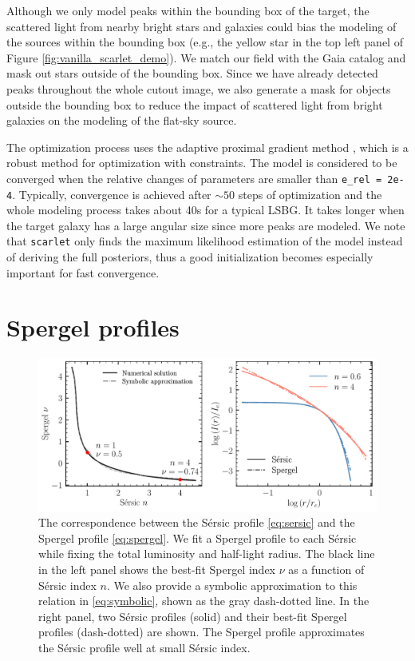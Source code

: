 \documentclass[twocolumn,astrosymb,twocolappendix,linenumbers]{aastex631}
\newcommand{\code}[1]{\texttt{#1}}
\newcommand{\sersic}{S\'ersic}
\begin{document}
\begin{CJK*}{UTF8}{gbsn}
Although we only model peaks within the bounding box of the target, the scattered light from nearby bright stars and galaxies could bias the modeling of the sources within the bounding box (e.g., the yellow star in the top left panel of Figure \ref{fig:vanilla_scarlet_demo}). We match our field with the Gaia catalog \citep{GAIA2016,GAIA2018} and mask out stars outside of the bounding box. Since we have already detected peaks throughout the whole cutout image, we also generate a mask for objects outside the bounding box to reduce the impact of scattered light from bright galaxies on the modeling of the flat-sky source. 

The optimization process uses the adaptive proximal gradient method \citep{Melchior2019}, which is a robust method for optimization with constraints. The model is considered to be converged when the relative changes of parameters are smaller than \code{e\_rel\,=\,2e-4}. Typically, convergence is achieved after $\sim 50$ steps of optimization and the whole modeling process takes about 40s for a typical LSBG. It takes longer when the target galaxy has a large angular size since more peaks are modeled. We note that \code{scarlet} only finds the maximum likelihood estimation of the model instead of deriving the full posteriors, thus a good initialization becomes especially important for fast convergence. 


\section{Spergel profiles}\label{ap:spergel}
\begin{figure}[htbp!]
	\vbox{ 
		\centering
		\includegraphics[width=0.85\linewidth]{spergel_sersic_calib.pdf}
	}
    \caption{The correspondence between the \sersic{} profile \eqref{eq:sersic} and the Spergel profile \eqref{eq:spergel}. We fit a Spergel profile to each \sersic{} while fixing the total luminosity and half-light radius. The black line in the left panel shows the best-fit Spergel index $\nu$ as a function of \sersic{} index $n$. We also provide a symbolic approximation to this relation in \eqref{eq:symbolic}, shown as the gray dash-dotted line. In the right panel, two \sersic{} profiles (solid) and their best-fit Spergel profiles (dash-dotted) are shown. The Spergel profile approximates the \sersic{} profile well at small \sersic{} index.  
    }
    \label{fig:spgl_calib}
\end{figure}


\end{CJK*}
\end{document}
